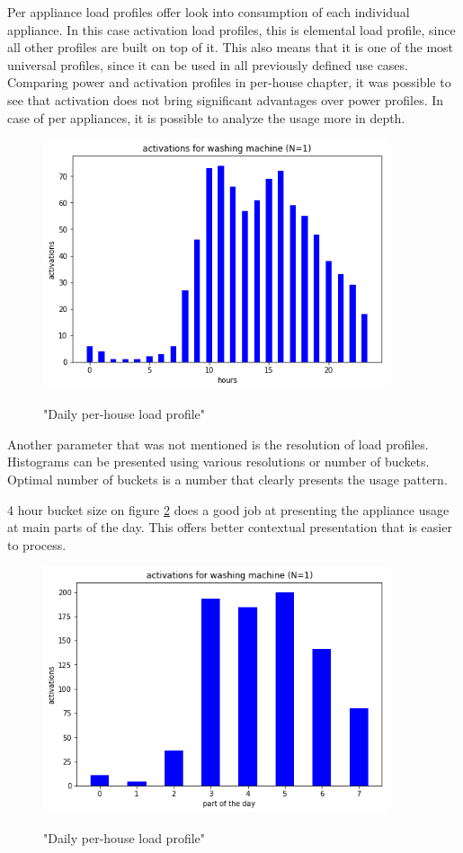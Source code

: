 Per appliance load profiles offer look into consumption of each individual appliance. 
In this case activation load profiles, this is elemental load profile, since all other 
profiles are built on top of it. 
This also means that it is one of the most universal profiles, since it can be used in all previously defined use cases.
Comparing power and activation profiles in per-house chapter,
it was possible to see that activation does not bring significant advantages over power profiles.
In case of per appliances, it is possible to analyze the usage more in depth.

\begin{figure}[H]
	\centering
	\caption{"Daily per-house load profile"}
	\includegraphics[width=0.9\textwidth]{../Figures/LPS/WM_daily.png}
	\label{fig:WM_daily}
\end{figure}

Another parameter that was not mentioned is the resolution of load profiles. 
Histograms can be presented using various resolutions or number of buckets.
Optimal number of buckets is a number that clearly presents the usage pattern. 

4 hour bucket size on figure \ref{fig:4hours} does a good job at presenting the appliance usage at main parts of the day.
This offers better contextual presentation that is easier to process.

\begin{figure}[H]
	\centering
	\caption{"Daily per-house load profile"}
	\includegraphics[width=0.9\textwidth]{../Figures/LPS/4 hours.png}
	\label{fig:4hours}
\end{figure}

